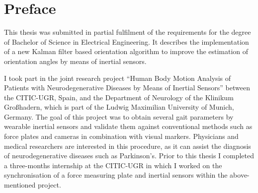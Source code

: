 \chapter*{Preface}

This thesis was submitted in partial fulfilment of the requirements for the degree of Bachelor of Science in Electrical Engineering. It describes the implementation of a new Kalman filter based orientation algorithm to improve the estimation of orientation angles by means of inertial sensors.

I took part in the joint research project “Human Body Motion Analysis of Patients with Neurodegenerative Diseases by Means of Inertial Sensors” between the \gls{CITIC-UGR}, Spain, and the Department of Neurology of the Klinikum Großhadern, which is part of the Ludwig Maximilian University of Munich, Germany. The goal of this project was to obtain several gait parameters by wearable inertial sensors and validate them against conventional methods such as force plates and cameras in combination with visual markers. Physicians and medical researchers are interested in this procedure, as it can assist the diagnosis of neurodegenerative diseases such as Parkinson's. Prior to this thesis I completed a three-months internship at the \gls{CITIC-UGR} in which I worked on the synchronisation of a force measuring plate and inertial sensors within the above-mentioned project.